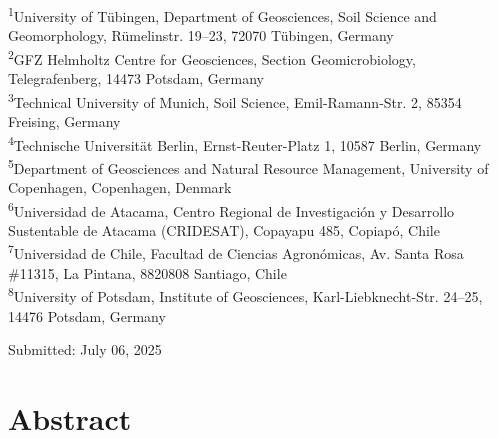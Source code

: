 \begin{scriptsize}
  \begin{justify}
    \textsuperscript{1}University of T{\"u}bingen, Department of Geosciences, Soil Science and Geomorphology, R{\"u}melinstr. 19--23, 72070 T{\"u}bingen, Germany\\
    \textsuperscript{2}GFZ Helmholtz Centre for Geosciences, Section Geomicrobiology, Telegrafenberg, 14473 Potsdam, Germany\\
    \textsuperscript{3}Technical University of Munich, Soil Science, Emil-Ramann-Str. 2, 85354 Freising, Germany\\
    \textsuperscript{4}Technische Universit{\"a}t Berlin, Ernst-Reuter-Platz 1, 10587 Berlin, Germany\\
    \textsuperscript{5}Department of Geosciences and Natural Resource Management, University of Copenhagen, Copenhagen, Denmark\\
    \textsuperscript{6}Universidad de Atacama, Centro Regional de Investigaci{\'o}n y Desarrollo Sustentable de Atacama (CRIDESAT), Copayapu 485, Copiap{\'o}, Chile\\
    \textsuperscript{7}Universidad de Chile, Facultad de Ciencias Agron{\'o}micas, Av. Santa Rosa \#11315, La Pintana, 8820808 Santiago, Chile \\
    \textsuperscript{8}University of Potsdam, Institute of Geosciences, Karl-Liebknecht-Str. 24--25, 14476 Potsdam, Germany
  \end{justify}
\end{scriptsize}
  
\vspace{0.4cm}

\begin{flushleft}
  Submitted: July 06, 2025\\
\end{flushleft}

\cleardoublepage

\section*{Abstract} %

